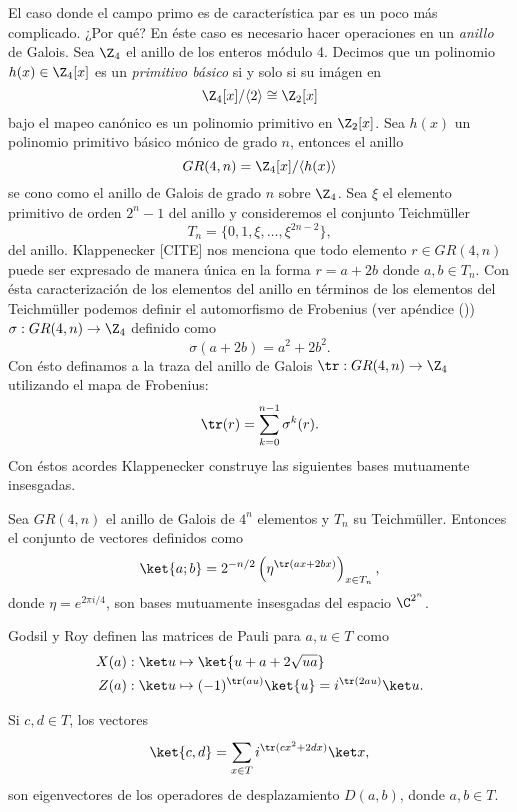   El caso donde el campo primo es de característica par es
  un poco más complicado. ¿Por qué? En éste caso es
  necesario hacer operaciones en un \textit{anillo} de
  Galois. Sea $\Z_4$ el anillo de los enteros módulo 4.
  Decimos que un polinomio $h(x) \in \Z_4[x]$ es un
  \textit{primitivo básico} si y solo si su imágen en
  \[
    \Z_4[x] / \langle 2 \rangle
    \cong
    \Z_2[x]
  \] 
  bajo el mapeo canónico es un polinomio primitivo en
  $\Z_2[x]$. Sea $h(x)$ un polinomio primitivo básico mónico
  de grado $n$, entonces el anillo
  \begin{equation}
    GR(4,n)
    = \Z_4[x] / \langle h(x) \rangle    
  \end{equation}
  se cono como el anillo de Galois de grado $n$ sobre
  $\Z_4$.
  Sea $\xi$ el elemento primitivo de orden $2^{n}-1$ del
  anillo y consideremos el conjunto Teichmüller
  \[
    T_n
    = \{0,1,\xi,\ldots,\xi^{2n-2}\},
  \] 
  del anillo. Klappenecker [CITE] nos menciona que todo
  elemento $r \in GR(4,n)$ puede ser expresado de manera
  única en la forma $r = a + 2b$ donde $a,b \in T_n$. Con
  ésta caracterización de los elementos del anillo en
  términos de los elementos del Teichmüller podemos definir
  el automorfismo de Frobenius (ver apéndice ()) $\sigma :
  GR(4,n) \to \Z_4$ definido como
  \[
    \sigma(a+2b)
    = a^2+2b^2.
  \] 
  Con ésto definamos a la traza del anillo de Galois $\tr :
  GR(4,n) \to \Z_4$ utilizando el mapa de Frobenius:
  \[
    \tr(r)
    = \sum_{k=0}^{n-1} \sigma^{k}(r).
  \] 
  Con éstos acordes Klappenecker construye las siguientes
  bases mutuamente insesgadas.
  \begin{proposition}
    Sea $GR(4,n)$ el anillo de Galois de $4^{n}$ elementos y
    $T_n$ su Teichmüller. Entonces el conjunto de vectores
    definidos como
    \begin{equation}
      \ket{a; b}
      = 2^{-n / 2} \left(
        \eta^{\tr\left( ax + 2bx \right)}
      \right)_{x \in T_n},
    \end{equation}
    donde $\eta = e^{2\pi i / 4}$, son bases mutuamente
    insesgadas del espacio $\C^{2^{n}}$.
  \end{proposition}

  Godsil y Roy definen las matrices de Pauli para $a, u \in
  T$ como
  \begin{align}
    X(a) &: \ket u \mapsto \ket{u+a+2 \sqrt{ua}} \\
    Z(a) &: \ket u \mapsto (-1)^{\tr(au)} \ket{u}
    = i^{\tr(2au)}\ket u.
  \end{align}
  \begin{proposition}
    Si $c,d \in T$, los vectores
    \begin{equation}
      \ket{c,d}
      = \sum_{x \in T}^{} i^{\tr(cx^2+2dx)} \ket x,
    \end{equation}
    son eigenvectores de los operadores de desplazamiento
    $D(a,b)$, donde $a,b \in T$.
  \end{proposition}
